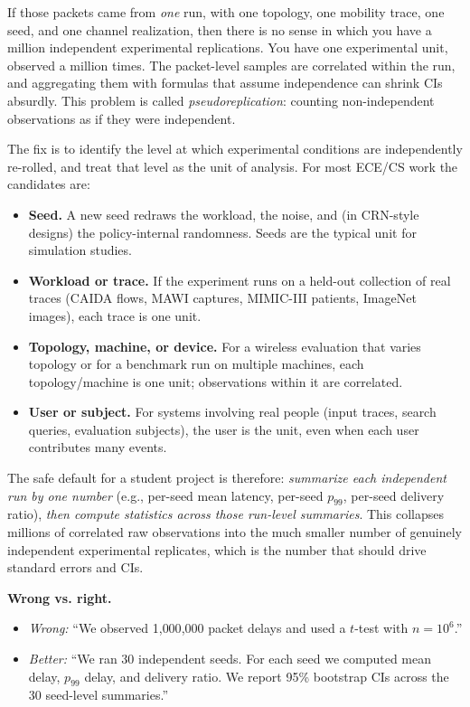 \documentclass[11pt]{article}
\begin{document}
If those packets came from \emph{one} run, with one topology, one mobility trace, one seed, and one channel realization, then there is no sense in which you have a million independent experimental replications. You have one experimental unit, observed a million times. The packet-level samples are correlated within the run, and aggregating them with formulas that assume independence can shrink CIs absurdly. This problem is called \emph{pseudoreplication}: counting non-independent observations as if they were independent.

The fix is to identify the level at which experimental conditions are independently re-rolled, and treat that level as the unit of analysis. For most ECE/CS work the candidates are:

\begin{itemize}
    \item \textbf{Seed.} A new seed redraws the workload, the noise, and (in CRN-style designs) the policy-internal randomness. Seeds are the typical unit for simulation studies.
    \item \textbf{Workload or trace.} If the experiment runs on a held-out collection of real traces (CAIDA flows, MAWI captures, MIMIC-III patients, ImageNet images), each trace is one unit.
    \item \textbf{Topology, machine, or device.} For a wireless evaluation that varies topology or for a benchmark run on multiple machines, each topology/machine is one unit; observations within it are correlated.
    \item \textbf{User or subject.} For systems involving real people (input traces, search queries, evaluation subjects), the user is the unit, even when each user contributes many events.
\end{itemize}

The safe default for a student project is therefore: \emph{summarize each independent run by one number} (e.g., per-seed mean latency, per-seed $p_{99}$, per-seed delivery ratio), \emph{then compute statistics across those run-level summaries}. This collapses millions of correlated raw observations into the much smaller number of genuinely independent experimental replicates, which is the number that should drive standard errors and CIs.

\begin{shaded*}
\noindent\textbf{Wrong vs. right.}
\begin{itemize}[leftmargin=*, itemsep=1pt]
    \item \emph{Wrong:} ``We observed 1{,}000{,}000 packet delays and used a $t$-test with $n = 10^6$.''
    \item \emph{Better:} ``We ran 30 independent seeds. For each seed we computed mean delay, $p_{99}$ delay, and delivery ratio. We report 95\% bootstrap CIs across the 30 seed-level summaries.''
\end{itemize}
\end{shaded*}
\end{document}
